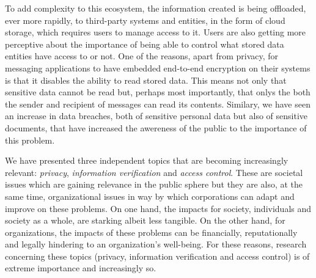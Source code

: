 To add complexity to this ecosystem, the information created is being offloaded, ever more rapidly, to third-party systems and entities, in the form of cloud storage, which requires users to manage access to it. Users are also getting more perceptive about the importance of being able to control what stored data entities have access to or not. One of the reasons, apart from privacy, for messaging applications to have embedded end-to-end encryption on their systems is that it disables the ability to read stored data. This means not only that sensitive data cannot be read but, perhaps most importantly, that onlys the both the sender and recipient of messages can read its contents. Similary, we have seen an increase in data breaches, both of sensitive personal data but also of sensitive documents, that have increased the awereness of the public to the importance of this problem.

We have presented three independent topics that are becoming increasingly relevant: \textit{privacy}, \textit{information verification} and \textit{access control}. These are societal issues which are gaining relevance in the public sphere but they are also, at the same time, organizational issues in way by which corporations can adapt and improve on these problems. On one hand, the impacts for society, individuals and society as a whole, are starking albeit less tangible. On the other hand, for organizations, the impacts of these problems can be financially, reputationally and legally hindering to an organization's well-being. For these reasons, research concerning these topics (privacy, information verification and access control) is of extreme importance and increasingly so.

